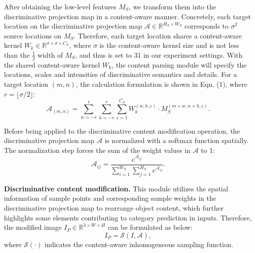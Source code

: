 \documentclass[letterpaper]{article} %
\begin{document}
After obtaining the low-level features $ M_S $, we transform them into the discriminative projection map in a content-aware manner. Concretely, each target location on the discriminative projection map $ \mathcal{A} \in \mathbb{R}^{H_S \times W_S} $ corresponds to $ \sigma^2 $ source locations on $ M_S $. Therefore, each target location shares a content-aware kernel $ W_k \in \mathbb{R}^{ \sigma \times \sigma \times C_S } $, where $ \sigma $ is the content-aware kernel size and is not less than the $ \frac{1}{2} $ width of $ M_S $, and thus is set to 31 in our experiment settings. With the shared content-aware kernel $ W_k $, the content parsing module will specify the locations, scales and intensities of discriminative semantics and details. For a target location $ (m, n) $, the calculation formulation is shown in Eqn. (1), where $ r = \lfloor \sigma/2\rfloor $:
\begin{equation}
\mathcal{A}_{(m,n)} = \sum_{w=-r}^r\sum_{h=-r}^r \sum_{c=1}^{C_S} W_k^{(w,h,c)} \cdot M_S^{(m+w, n+h,c)}.
\end{equation}

Before being applied to the discriminative content modification operation, the discriminative projection map $ \mathcal{A} $ is normalized with a softmax function spatially. The normalization step forces the sum of the weight values in $ \mathcal{A} $ to 1:
\begin{equation}
 \mathcal{A}_{ij}= \frac{e^{\mathcal{A}_{ij}}}{\sum_{i=1}^{W_S}\sum_{j=1}^{H_S}e^{\mathcal{A}_{ij}}}.
\end{equation}

\textbf{Discriminative content modification.}
This module utilizes the spatial information of sample points and corresponding sample weights in the discriminative projection map to rearrange object content, which further highlights some elements contributing to category prediction in inputs. Therefore, the modified image $ I_P \in\mathbb{R}^{3\times W \times H} $ can be formulated as below:
\begin{equation}
I_P = \mathcal{S}(I, \mathcal{A}),
\end{equation}
where $ \mathcal{S}(\cdot) $ indicates the content-aware inhomogeneous sampling function.
\end{document}
